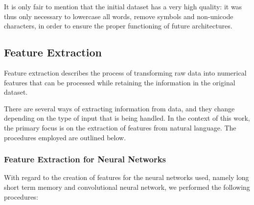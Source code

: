 \documentclass[letterpaper,11pt]{article}
\begin{document}
It is only fair to mention that the initial dataset has a very high quality: it was thus only necessary to lowercase all words, remove symbols and non-unicode characters, in order to ensure the proper functioning of future architectures.

\subsection{Feature Extraction}
\label{subsec:feature_extr}

Feature extraction describes the process of transforming raw data into numerical features that can be processed while retaining the information in the original dataset.

There are several ways of extracting information from data, and they change depending on the type of input that is being handled. In the context of this work, the primary focus is on the extraction of features from natural language. The procedures employed are outlined below.

\subsubsection*{Feature Extraction for Neural Networks}

With regard to the creation of features for the neural networks used, namely long short term memory and convolutional neural network, we performed the following procedures:
\end{document}
